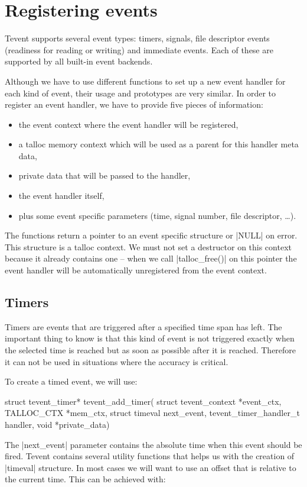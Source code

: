 \section{Registering events}

Tevent supports several event types: timers,  signals, file descriptor events
(readiness for reading or writing) and immediate events. Each of these
are supported by all built-in event backends.

Although we have to use different functions to set up a new event handler for
each kind of event, their usage and prototypes are very similar. In order to
register an event handler, we have to provide five pieces of information:

\begin{itemize}
  \item the event context where the event handler will be registered,
  \item a talloc memory context which will be used as a parent for this handler
  meta data,
  \item private data that will be passed to the handler,
  \item the event handler itself,
  \item plus some event specific parameters (time, signal number, file
  descriptor, \ldots).
\end{itemize}

The functions return a pointer to an event specific structure or |NULL| on
error. This structure is a talloc context. We must not set a destructor on this
context because it already contains one -- when we call |talloc_free()| on this
pointer the event handler will be automatically unregistered from the event
context.

\subsection{Timers}

Timers are events that are triggered after a specified time span has left. The
important thing to know is that this kind of event is not triggered exactly
when the selected time is reached but as soon as possible after it is reached.
Therefore it can not be used in situations where the accuracy is critical.

To create a timed event, we will use:

\begin{funcproto}
struct tevent_timer* tevent_add_timer(
             struct tevent_context *event_ctx,
             TALLOC_CTX *mem_ctx,
             struct timeval next_event,
             tevent_timer_handler_t handler,
             void *private_data)
\end{funcproto}
\funclistend
The |next_event| parameter contains the absolute time when this event should be
fired. Tevent contains several utility functions\cite{TeventDocTimeval}
that helps us with the creation of |timeval| structure. In most cases we will
want to use an offset that is relative to the current time. This can be achieved
with:


